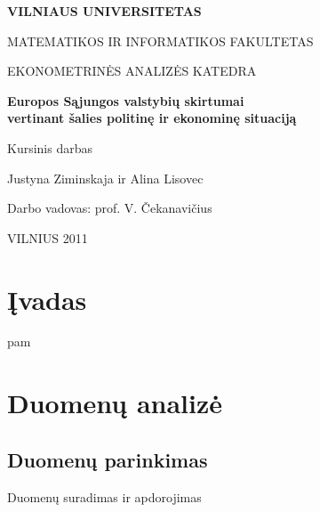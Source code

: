 \documentclass[12pt,a4paper]{article}
\theoremstyle{change}\newtheorem{salyga}{Uždavinys}
\begin{document}
\begin{titlepage}

\centerline{\bf \large VILNIAUS UNIVERSITETAS}

\centerline{\large MATEMATIKOS IR INFORMATIKOS FAKULTETAS}
\centerline{\large EKONOMETRINĖS ANALIZĖS KATEDRA}



\vskip 50pt
\begin{center}
    {\bf \LARGE Europos Sąjungos valstybių skirtumai\\
    \smallskip  
    \smallskip
    vertinant šalies politinę ir ekonominę situaciją}
\end{center}
\bigskip
\centerline{\Large Kursinis darbas}
\vskip 110pt
\begin{flushright}
 {\Large                                              Justyna Ziminskaja ir Alina Lisovec}

{\large                                               Darbo vadovas: prof. V. Čekanavičius}
\end{flushright}
\vskip 300pt
\centerline{\large VILNIUS 2011}



\end{titlepage}


\newpage
\tableofcontents
\newpage
\section{Įvadas }

pam 
\newpage


\section{Duomenų analizė}

\subsection{Duomenų parinkimas}
  Duomenų suradimas ir apdorojimas
\end{document}
